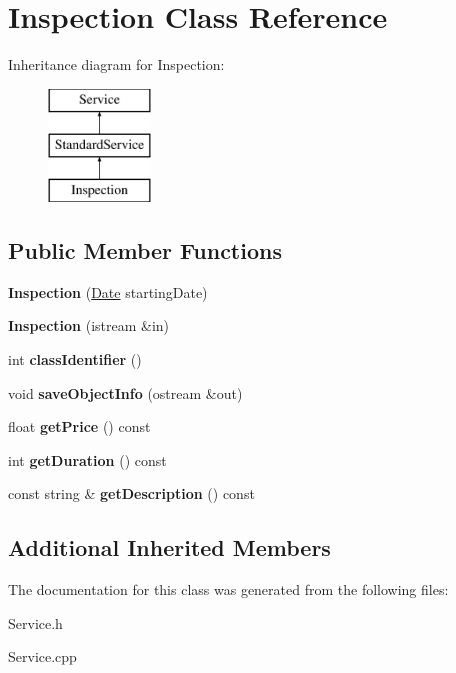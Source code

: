 \hypertarget{class_inspection}{}\section{Inspection Class Reference}
\label{class_inspection}
Inheritance diagram for Inspection\+:\begin{figure}[H]
\begin{center}
\leavevmode
\includegraphics[height=3.000000cm]{class_inspection}
\end{center}
\end{figure}
\subsection*{Public Member Functions}
\begin{DoxyCompactItemize}
\item 
\hypertarget{class_inspection_a4197cde5b81c545a48c884b4db758c52}{}{\bfseries Inspection} (\hyperlink{struct_date}{Date} starting\+Date)\label{class_inspection_a4197cde5b81c545a48c884b4db758c52}

\item 
\hypertarget{class_inspection_abfeb16e2c97e6e19fd3647adf322c9f4}{}{\bfseries Inspection} (istream \&in)\label{class_inspection_abfeb16e2c97e6e19fd3647adf322c9f4}

\item 
\hypertarget{class_inspection_a0ad13e8e242dd41ad35f6713243f1730}{}int {\bfseries class\+Identifier} ()\label{class_inspection_a0ad13e8e242dd41ad35f6713243f1730}

\item 
\hypertarget{class_inspection_a17aad60b13f4ebff6db6081aa85e1b90}{}void {\bfseries save\+Object\+Info} (ostream \&out)\label{class_inspection_a17aad60b13f4ebff6db6081aa85e1b90}

\item 
\hypertarget{class_inspection_a3bad9f812251a99b7d2ffc5d0cf6d722}{}float {\bfseries get\+Price} () const \label{class_inspection_a3bad9f812251a99b7d2ffc5d0cf6d722}

\item 
\hypertarget{class_inspection_ad15f23a330708874ed5fe733418c0c7a}{}int {\bfseries get\+Duration} () const \label{class_inspection_ad15f23a330708874ed5fe733418c0c7a}

\item 
\hypertarget{class_inspection_a4abfb814dbf9a270c5dded4ef952d5c5}{}const string \& {\bfseries get\+Description} () const \label{class_inspection_a4abfb814dbf9a270c5dded4ef952d5c5}

\end{DoxyCompactItemize}
\subsection*{Additional Inherited Members}


The documentation for this class was generated from the following files\+:\begin{DoxyCompactItemize}
\item 
Service.\+h\item 
Service.\+cpp\end{DoxyCompactItemize}
